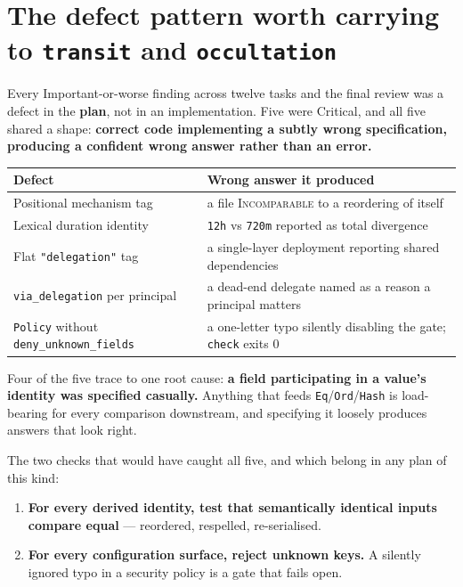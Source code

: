 \documentclass[11pt]{article}
\newcommand{\keypoint}[1]{\textbf{#1}}
\begin{document}
\section*{The defect pattern worth carrying to \texttt{transit} and \texttt{occultation}}

Every Important-or-worse finding across twelve tasks and the final review was a
defect in the \keypoint{plan}, not in an implementation. Five were Critical, and
all five shared a shape: \keypoint{correct code implementing a subtly wrong
specification, producing a confident wrong answer rather than an error.}

\vspace{0.4em}
\begin{center}
\small
\begin{tabular}{@{}p{6.2cm}p{8.4cm}@{}}
\toprule
\textbf{Defect} & \textbf{Wrong answer it produced} \\
\midrule
Positional mechanism tag &
  a file \textsc{Incomparable} to a reordering of itself \\
Lexical duration identity &
  \texttt{12h} vs \texttt{720m} reported as total divergence \\
Flat \texttt{"delegation"} tag &
  a single-layer deployment reporting shared dependencies \\
\texttt{via\_delegation} per principal &
  a dead-end delegate named as a reason a principal matters \\
\texttt{Policy} without \texttt{deny\_unknown\_fields} &
  a one-letter typo silently disabling the gate; \texttt{check} exits 0 \\
\bottomrule
\end{tabular}
\end{center}
\vspace{0.4em}

Four of the five trace to one root cause: \keypoint{a field participating in a
value's identity was specified casually.} Anything that feeds
\texttt{Eq}/\texttt{Ord}/\texttt{Hash} is load-bearing for every comparison
downstream, and specifying it loosely produces answers that look right.

The two checks that would have caught all five, and which belong in any plan of
this kind:

\begin{enumerate}
  \item \keypoint{For every derived identity, test that semantically identical
    inputs compare equal} --- reordered, respelled, re-serialised.
  \item \keypoint{For every configuration surface, reject unknown keys.} A
    silently ignored typo in a security policy is a gate that fails open.
\end{enumerate}
\end{document}
